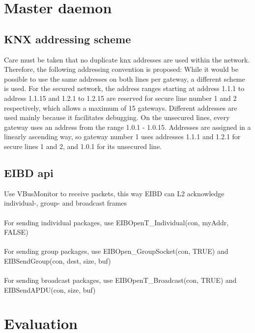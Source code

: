 \label{chap5}
\section{Master daemon}

\subsection{KNX addressing scheme}

Care must be taken that no duplicate \gls{knx} addresses are used within the network. Therefore, the following addressing convention is proposed:
While it would be possible to use the same addresses on both lines per gateway, a different scheme is used.
For the secured network, the address ranges starting at address 1.1.1 to address 1.1.15 and 1.2.1 to 1.2.15 are reserved for secure line number
1 and 2 respectively, which allows a maximum of 15 gateways. Different addresses are used mainly because it facilitates debugging. 
On the unsecured lines, every gateway uses an address from the range 1.0.1 - 1.0.15. Addresses are assigned in a linearly ascending way, so gateway number 1
uses addresses 1.1.1 and 1.2.1 for secure lines 1 and 2, and 1.0.1 for its unsecured line.

\subsection{EIBD \gls{api}}

Use VBusMonitor to receive packets, this way EIBD can L2 acknowledge individual-, group- and broadcast frames
\\
\\
For sending individual packages, use EIBOpenT_Individual(con, myAddr, FALSE)
\\
\\
For sending group packages, use EIBOpen_GroupSocket(con, TRUE) and EIBSendGroup(con, dest, size, buf)
\\
\\
For sending broadcast packages, use EIBOpenT_Broadcast(con, TRUE) and EIBSendAPDU(con, size, buf)




\section{Evaluation}

